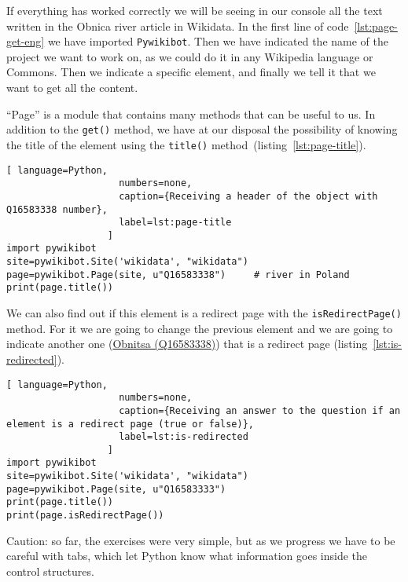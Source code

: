 If everything has worked correctly we will be seeing in our console all the text written in the Obnica river article  in Wikidata. 
In the first line of code~\ref{lst:page-get-eng} we have imported \lstinline|Pywikibot|. 
Then we have indicated the name of the project we want to work on, as we could do it in any Wikipedia language or Commons. Then we indicate a specific element, and finally we tell it that we want to get all the content.


``Page'' is a module that contains many methods that can be useful to us. 
%
In addition to the \lstinline|get()| method, 
we have at our disposal the possibility of knowing the title of the element 
using the \lstinline|title()| method~(listing~\ref{lst:page-title}).

\begin{lstlisting}[ language=Python,
                    numbers=none,
                    caption={Receiving a header of the object with Q16583338 number},
                    label=lst:page-title
                  ]
import pywikibot
site=pywikibot.Site('wikidata', "wikidata")
page=pywikibot.Page(site, u"Q16583338")     # river in Poland
print(page.title())
\end{lstlisting}

We can also find out if this element is a redirect page 
with the \mbox{\lstinline|isRedirectPage()|} method. 
For it we are going to change the previous element and we are going to indicate another one  
(\href{https://www.wikidata.org/w/index.php?title=Q16583333&redirect=no}{Obnitsa (Q16583338)}) that is a redirect page (listing~\ref{lst:is-redirected}).

\begin{lstlisting}[ language=Python,
                    numbers=none,
                    caption={Receiving an answer to the question if an element is a redirect page (true or false)},
                    label=lst:is-redirected
                  ]
import pywikibot
site=pywikibot.Site('wikidata', "wikidata")
page=pywikibot.Page(site, u"Q16583333")
print(page.title())
print(page.isRedirectPage())
\end{lstlisting}

Caution: so far, the exercises were very simple, but as we progress we have to be careful with tabs, which let Python know what information goes inside the control structures.

